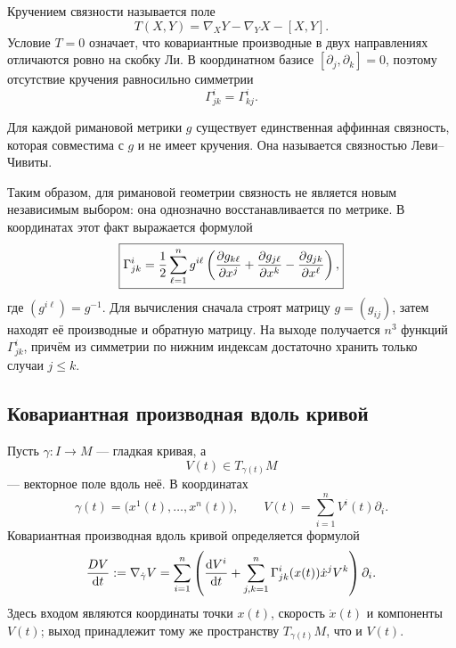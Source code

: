Кручением связности называется поле
\begin{equation}
\label{eq:connection-torsion-definition}
T(X,Y)=\nabla_XY-\nabla_YX-[X,Y].
\end{equation}
Условие $T=0$ означает, что ковариантные производные в двух направлениях отличаются ровно на скобку Ли. В координатном базисе $[\partial_j,\partial_k]=0$, поэтому отсутствие кручения равносильно симметрии
\[
\Gamma^i_{jk}=\Gamma^i_{kj}.
\]

\begin{theorem}
Для каждой римановой метрики $g$ существует единственная аффинная связность, которая совместима с $g$ и не имеет кручения. Она называется связностью Леви--Чивиты.
\end{theorem}

Таким образом, для римановой геометрии связность не является новым независимым выбором: она однозначно восстанавливается по метрике. В координатах этот факт выражается формулой
\begin{equation}
\label{eq:christoffel-from-metric}
\boxed{
\Gamma^i_{jk}
=
\frac12
\sum_{\ell=1}^n
 g^{i\ell}
\left(
\frac{\partial g_{k\ell}}{\partial x^j}
+
\frac{\partial g_{j\ell}}{\partial x^k}
-
\frac{\partial g_{jk}}{\partial x^\ell}
\right),
}
\end{equation}
где $(g^{i\ell})=g^{-1}$. Для вычисления сначала строят матрицу $g=(g_{ij})$, затем находят её производные и обратную матрицу. На выходе получается $n^3$ функций $\Gamma^i_{jk}$, причём из симметрии по нижним индексам достаточно хранить только случаи $j\leq k$.

\subsection{Ковариантная производная вдоль кривой}

Пусть $\gamma:I\to M$ --- гладкая кривая, а
\[
V(t)\in T_{\gamma(t)}M
\]
--- векторное поле вдоль неё. В координатах
\[
\gamma(t)=\bigl(x^1(t),\ldots,x^n(t)\bigr),
\qquad
V(t)=\sum_{i=1}^nV^i(t)\partial_i.
\]
Ковариантная производная вдоль кривой определяется формулой
\begin{equation}
\label{eq:covariant-derivative-along-curve}
\frac{DV}{\mathop{}\!\mathrm{d} t}
:=
\nabla_{\dot\gamma}V
=
\sum_{i=1}^n
\left(
\frac{\mathop{}\!\mathrm{d} V^i}{\mathop{}\!\mathrm{d} t}
+
\sum_{j,k=1}^n
\Gamma^i_{jk}(x(t))\dot x^jV^k
\right)\partial_i.
\end{equation}
Здесь входом являются координаты точки $x(t)$, скорость $\dot x(t)$ и компоненты $V(t)$; выход принадлежит тому же пространству $T_{\gamma(t)}M$, что и $V(t)$.

